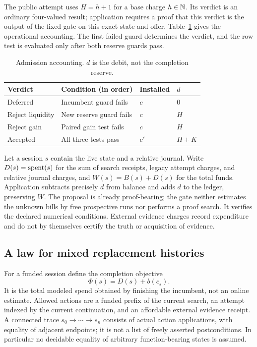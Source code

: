 The public attempt uses $H=h+1$ for a base charge $h\in\mathbb N$. Its verdict is an ordinary four-valued result; application requires a proof that this verdict is the output of the fixed gate on this exact state and offer. Table~\ref{tab:debit} gives the operational accounting. The first failed guard determines the verdict, and the row test is evaluated only after both reserve guards pass.
\begin{table}[htbp]
\centering\small
\caption{Admission accounting. $d$ is the debit, not the completion reserve.}\label{tab:debit}
\begin{tabularx}{\linewidth}{@{}lXll@{}}\toprule
Verdict & Condition (in order) & Installed & $d$\\\midrule
Deferred & Incumbent guard fails & $c$ & $0$\\
Reject liquidity & New reserve guard fails & $c$ & $H$\\
Reject gain & Paired gain test fails & $c$ & $H$\\
Accepted & All three tests pass & $c'$ & $H+K$\\\bottomrule
\end{tabularx}
\end{table}

Let a session $s$ contain the live state and a relative journal. Write $D(s)=\operatorname{spent}(s)$ for the sum of search receipts, legacy attempt charges, and relative journal charges, and $W(s)=B(s)+D(s)$ for the total funds. Application subtracts precisely $d$ from balance and adds $d$ to the ledger, preserving $W$. The proposal is already proof-bearing; the gate neither estimates the unknown bills by free prospective runs nor performs a proof search. It verifies the declared numerical conditions. External evidence charges record expenditure and do not by themselves certify the truth or acquisition of evidence.

\subsection{A law for mixed replacement histories}
For a funded session define the completion objective
\begin{equation}\label{eq:root-objective}
 \Phi(s)=D(s)+b(c_s).
\end{equation}
It is the total modeled spend obtained by finishing the incumbent, not an online estimate. Allowed actions are a funded prefix of the current search, an attempt indexed by the current continuation, and an affordable external evidence receipt. A connected trace $s_0\to\cdots\to s_n$ consists of actual action applications, with equality of adjacent endpoints; it is not a list of freely asserted postconditions. In particular no decidable equality of arbitrary function-bearing states is assumed.

